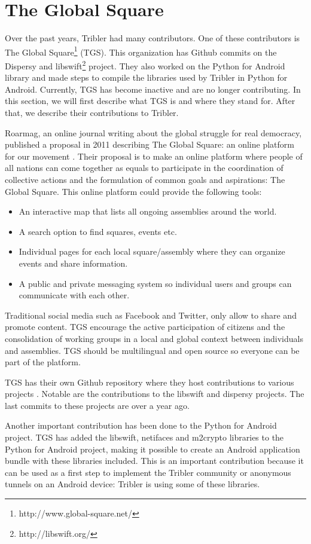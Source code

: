 \section{The Global Square}
	\label{scc:tgs}
	Over the past years, Tribler had many contributors. One of these contributors is The Global Square\footnote{http://www.global-square.net/} (TGS). This organization has Github commits on the Dispersy and libswift\footnote{http://libswift.org/} project. They also worked on the Python for Android library and made steps to compile the libraries used by Tribler in Python for Android. Currently, TGS has become inactive and are no longer contributing. In this section, we will first describe what TGS is and where they stand for. After that, we describe their contributions to Tribler.

	Roarmag, an online journal writing about the global struggle for real democracy, published a proposal in 2011 describing The Global Square: an online platform for our movement \cite{theglobalsquare}. Their proposal is to make an online platform where people of all nations can come together as equals to participate in the coordination of collective actions and the formulation of common goals and aspirations: The Global Square. This online platform could provide the following tools:
	\begin{itemize}
		\item An interactive map that lists all ongoing assemblies around the world.
		\item A search option to find squares, events etc.
		\item Individual pages for each local square/assembly where they can organize events and share information.
		\item A public and private messaging system so individual users and groups can communicate with each other.
	\end{itemize}
	Traditional social media such as Facebook and Twitter, only allow to share and promote content. TGS encourage the active participation of citizens and the consolidation of working groups in a local and global context between individuals and assemblies. TGS should be multilingual and open source so everyone can be part of the platform.
	
	TGS has their own Github repository where they host contributions to various projects \cite{theglobalsquaregithub}. Notable are the contributions to the libswift and dispersy projects. The last commits to these projects are over a year ago.
		
	Another important contribution has been done to the Python for Android project. TGS has added the libswift, netifaces and m2crypto libraries to the Python for Android project, making it possible to create an Android application bundle with these libraries included. This is an important contribution because it can be used as a first step to implement the Tribler community or anonymous tunnels on an Android device: Tribler is using some of these libraries.

